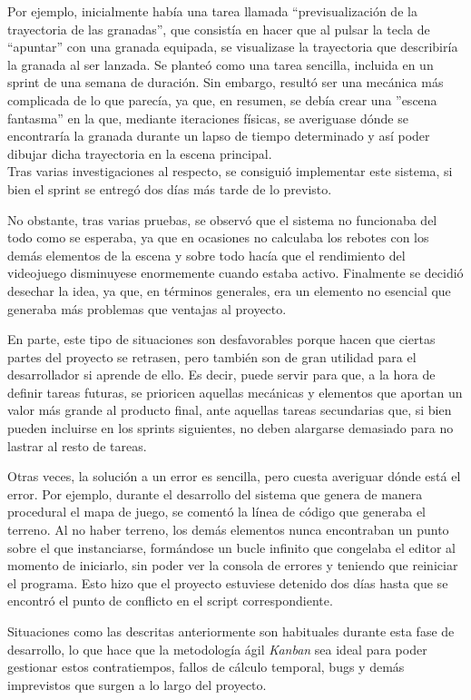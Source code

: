 Por ejemplo, inicialmente había una tarea llamada ``previsualización de la trayectoria de las granadas'', que consistía en hacer que al pulsar la tecla de ``apuntar'' con una granada equipada, se visualizase la trayectoria que describiría la granada al ser lanzada. Se planteó como una tarea sencilla, incluida en un sprint de una semana de duración.
Sin embargo, resultó ser una mecánica más complicada de lo que parecía, ya que, en resumen, se debía crear una ''escena fantasma'' en la que, mediante iteraciones físicas, se averiguase dónde se encontraría la granada durante un lapso de tiempo determinado y así poder dibujar dicha trayectoria en la escena principal.\\
Tras varias investigaciones al respecto, se consiguió implementar este sistema, si bien el sprint se entregó dos días más tarde de lo previsto.

No obstante, tras varias pruebas, se observó que el sistema no funcionaba del todo como se esperaba, ya que en ocasiones no calculaba los rebotes con los demás elementos de la escena y sobre todo hacía que el rendimiento del videojuego disminuyese enormemente cuando estaba activo. Finalmente se decidió desechar la idea, ya que, en términos generales, era un elemento no esencial que generaba más problemas que ventajas al proyecto.

En parte, este tipo de situaciones son desfavorables porque hacen que ciertas partes del proyecto se retrasen, pero también son de gran utilidad para el desarrollador si aprende de ello. Es decir, puede servir para que, a la hora de definir tareas futuras, se prioricen aquellas mecánicas y elementos que aportan un valor más grande al producto final, ante aquellas tareas secundarias que, si bien pueden incluirse en los sprints siguientes, no deben alargarse demasiado para no lastrar al resto de tareas.

Otras veces, la solución a un error es sencilla, pero cuesta averiguar dónde está el error. Por ejemplo, durante el desarrollo del sistema que genera de manera procedural el mapa de juego, se comentó la línea de código que generaba el terreno. Al no haber terreno, los demás elementos nunca encontraban un punto sobre el que instanciarse, formándose un bucle infinito que congelaba el editor al momento de iniciarlo, sin poder ver la consola de errores y teniendo que reiniciar el programa. Esto hizo que el proyecto estuviese detenido dos días hasta que se encontró el punto de conflicto en el script correspondiente.

Situaciones como las descritas anteriormente son habituales durante esta fase de desarrollo, lo que hace que la metodología ágil \textit{Kanban} sea ideal para poder gestionar estos contratiempos, fallos de cálculo temporal, bugs y demás imprevistos que surgen a lo largo del proyecto.


